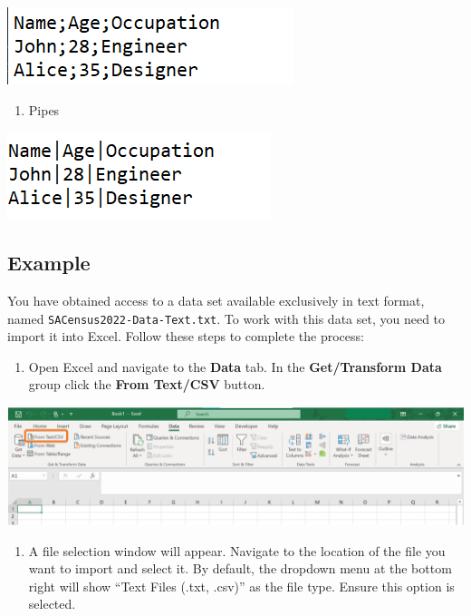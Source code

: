 \documentclass[
]{book}
\providecommand{\tightlist}{%
  \setlength{\itemsep}{0pt}\setlength{\parskip}{0pt}}
\begin{document}
\begin{center}\includegraphics[width=0.3\linewidth]{Figures/import_semicolon} \end{center}

\begin{enumerate}
\def\labelenumi{\arabic{enumi}.}
\setcounter{enumi}{3}
\tightlist
\item
  Pipes
\end{enumerate}

\begin{center}\includegraphics[width=0.3\linewidth]{Figures/import_pipes} \end{center}

\subsection*{Example}\label{example}

You have obtained access to a data set available exclusively in text format, named \texttt{SACensus2022-Data-Text.txt}. To work with this data set, you need to import it into Excel. Follow these steps to complete the process:

\begin{enumerate}
\def\labelenumi{\arabic{enumi}.}
\tightlist
\item
  Open Excel and navigate to the \textbf{Data} tab. In the \textbf{Get/Transform Data} group click the \textbf{From Text/CSV} button.
\end{enumerate}

\begin{center}\includegraphics[width=0.7\linewidth]{Figures/import_1} \end{center}

\begin{enumerate}
\def\labelenumi{\arabic{enumi}.}
\setcounter{enumi}{1}
\tightlist
\item
  A file selection window will appear. Navigate to the location of the file you want to import and select it. By default, the dropdown menu at the bottom right will show ``Text Files (.txt, .csv)'' as the file type. Ensure this option is selected.
\end{enumerate}
\end{document}
